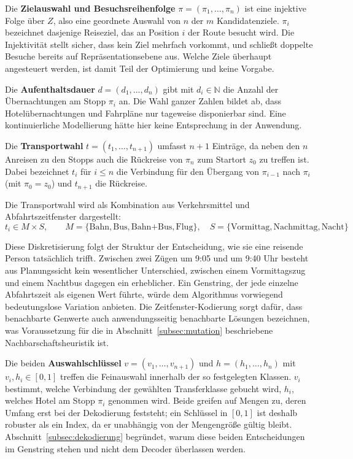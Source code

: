 Die \textbf{Zielauswahl und Besuchsreihenfolge} $\pi = (\pi_1, \dots, \pi_n)$ ist eine injektive Folge über $Z$, also eine geordnete Auswahl von $n$ der $m$ Kandidatenziele. $\pi_i$ bezeichnet dasjenige Reiseziel, das an Position $i$ der Route besucht wird. Die Injektivität stellt sicher, dass kein Ziel mehrfach vorkommt, und schließt doppelte Besuche bereits auf Repräsentationsebene aus. Welche Ziele überhaupt angesteuert werden, ist damit Teil der Optimierung und keine Vorgabe.

Die \textbf{Aufenthaltsdauer} $d = (d_1, \dots, d_n)$ gibt mit $d_i \in \mathbb{N}$ die Anzahl der Übernachtungen am Stopp $\pi_i$ an. Die Wahl ganzer Zahlen bildet ab, dass Hotelübernachtungen und Fahrpläne nur tageweise disponierbar sind. Eine kontinuierliche Modellierung hätte hier keine Entsprechung in der Anwendung.

Die \textbf{Transportwahl} $t = (t_1, \dots, t_{n+1})$ umfasst $n+1$ Einträge, da neben den $n$ Anreisen zu den Stopps auch die Rückreise von $\pi_n$ zum Startort $z_0$ zu treffen ist. Dabei bezeichnet $t_i$ für $i \leq n$ die Verbindung für den Übergang von $\pi_{i-1}$ nach $\pi_i$ (mit $\pi_0 = z_0$) und $t_{n+1}$ die Rückreise.

Die Transportwahl wird als Kombination aus Verkehrsmittel und Abfahrtszeitfenster dargestellt:
\begin{equation}
t_i \in M \times S, \qquad M = \{\text{Bahn}, \text{Bus}, \text{Bahn+Bus}, \text{Flug}\}, \quad S = \{\text{Vormittag}, \text{Nachmittag}, \text{Nacht}\}
\end{equation}

Diese Diskretisierung folgt der Struktur der Entscheidung, wie sie eine reisende Person tatsächlich trifft. Zwischen zwei Zügen um 9:05 und um 9:40 Uhr besteht aus Planungssicht kein wesentlicher Unterschied, zwischen einem Vormittagszug und einem Nachtbus dagegen ein erheblicher. Ein Genstring, der jede einzelne Abfahrtszeit als eigenen Wert führte, würde dem Algorithmus vorwiegend bedeutungslose Variation anbieten. Die Zeitfenster-Kodierung sorgt dafür, dass benachbarte Genwerte auch anwendungsseitig benachbarte Lösungen bezeichnen, was Voraussetzung für die in Abschnitt~\ref{subsec:mutation} beschriebene Nachbarschaftsheuristik ist.

Die beiden \textbf{Auswahlschlüssel} $v = (v_1, \dots, v_{n+1})$ und $h = (h_1, \dots, h_n)$ mit $v_i, h_i \in [0,1]$ treffen die Feinauswahl innerhalb der so festgelegten Klassen. $v_i$ bestimmt, welche Verbindung der gewählten Transferklasse gebucht wird, $h_i$, welches Hotel am Stopp $\pi_i$ genommen wird. Beide greifen auf Mengen zu, deren Umfang erst bei der Dekodierung feststeht; ein Schlüssel in $[0,1]$ ist deshalb robuster als ein Index, da er unabhängig von der Mengengröße gültig bleibt. Abschnitt~\ref{subsec:dekodierung} begründet, warum diese beiden Entscheidungen im Genstring stehen und nicht dem Decoder überlassen werden.

